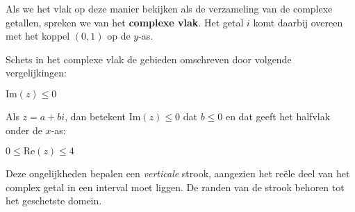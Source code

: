 \documentclass{ximera}
\begin{document}
Als we het vlak op deze manier bekijken als de verzameling van de complexe getallen, spreken we van het \textbf{complexe vlak}. Het getal $i$ komt daarbij overeen met het koppel $(0,1)$ op de $y$-as.

\begin{basicSkip}
\end{basicSkip}

\begin{exercise}
    Schets in het complexe vlak de gebieden omschreven door volgende vergelijkingen:
    \begin{question} 
        $\text{Im}(z) \leq 0$
        \begin{oplossing} Als $z=a+bi$, dan betekent Im$(z) \leq 0$ dat $b \leq 0$ en dat geeft het  halfvlak onder de $x$-as:
            
            \begin{image}[0.5\textwidth]
            \end{image}
        \end{oplossing}
    \end{question}
    
    \begin{question} 
        $0 \leq \text{Re}(z) \leq 4$
        \begin{oplossing} Deze ongelijkheden bepalen een \textit{verticale} strook, aangezien het reële deel van het complex getal in een interval moet liggen. De randen van de strook behoren tot het geschetste domein.
            
            \begin{image}[0.3\textwidth]
\end{image}
\end{oplossing}
\end{question}
\end{exercise}
\end{document}
